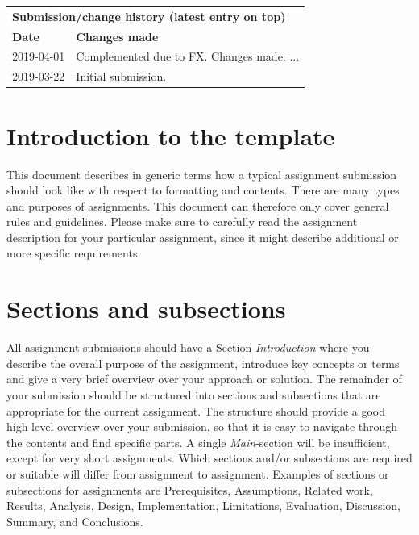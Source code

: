 \documentclass[12pt,a4paper]{article}
\begin{document}
\begin{small}
\begin{longtable}{|l|p{13.3cm}|}
\hline
\multicolumn{2}{|l|}{\textbf{Submission/change history (latest entry on top)}} \\
\textbf{Date} & \textbf{Changes made} \\
\hline
2019-04-01 & Complemented due to FX. Changes made: ... \\
\hline 
2019-03-22 & Initial submission. \\
\hline 
\end{longtable}
\end{small}

\setcounter{table}{0}  %


\newpage

\section{Introduction to the template}
\label{sec:intro}
This document describes in generic terms how a typical assignment submission should look like with respect to formatting and contents.
There are many types and purposes of assignments.
This document can therefore only cover general rules and guidelines.
Please make sure to carefully read the assignment description for your particular assignment, since it might describe additional or more specific requirements.


\section{Sections and subsections}
\label{sec:main}
All assignment submissions should have a Section \textit{Introduction} where you describe the overall purpose of the assignment, introduce key concepts or terms and give a very brief overview over your approach or solution. The remainder of your submission should be structured into sections and subsections that are appropriate for the current assignment. The structure should provide a good high-level overview over your submission, so that it is easy to navigate through the contents and find specific parts. A single \textit{Main}-section will be insufficient, except for very short assignments.
Which sections and/or subsections are required or suitable will differ from assignment to assignment. Examples of sections or subsections for assignments are Prerequisites, Assumptions, Related work, Results, Analysis, Design, Implementation, Limitations, Evaluation, Discussion, Summary, and Conclusions.
\end{document}
